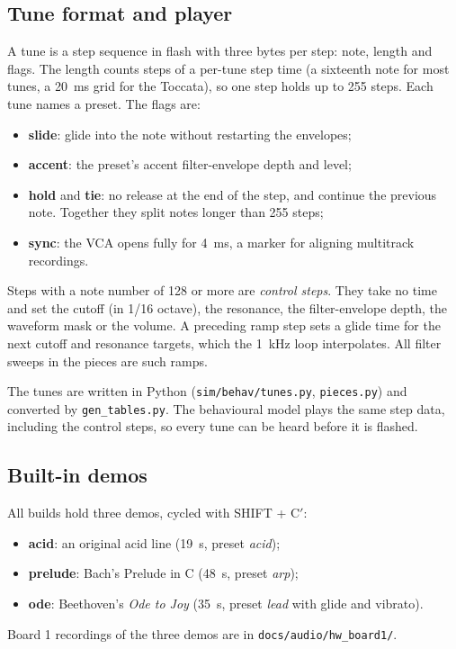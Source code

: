 \documentclass[11pt,a4paper]{article}
\newcommand{\file}[1]{\texttt{#1}}
\begin{document}
\subsection{Tune format and player}
A tune is a step sequence in flash with three bytes per step: note, length and flags. The length counts steps
of a per-tune step time (a sixteenth note for most tunes, a \SI{20}{ms} grid for the Toccata), so one step
holds up to 255 steps. Each tune names a preset. The flags are:
\begin{itemize}
  \item \textbf{slide}: glide into the note without restarting the envelopes;
  \item \textbf{accent}: the preset's accent filter-envelope depth and level;
  \item \textbf{hold} and \textbf{tie}: no release at the end of the step, and continue the previous note.
    Together they split notes longer than 255 steps;
  \item \textbf{sync}: the VCA opens fully for \SI{4}{ms}, a marker for aligning multitrack recordings.
\end{itemize}
Steps with a note number of 128 or more are \emph{control steps}. They take no time and set the cutoff
(in 1/16 octave), the resonance, the filter-envelope depth, the waveform mask or the volume. A preceding ramp
step sets a glide time for the next cutoff and resonance targets, which the \SI{1}{kHz} loop interpolates.
All filter sweeps in the pieces are such ramps.

The tunes are written in Python (\file{sim/behav/tunes.py}, \file{pieces.py}) and converted by
\file{gen\_tables.py}. The behavioural model plays the same step data, including the control steps, so
every tune can be heard before it is flashed.

\subsection{Built-in demos}
All builds hold three demos, cycled with SHIFT + C$'$:
\begin{itemize}
  \item \textbf{acid}: an original acid line (\SI{19}{s}, preset \emph{acid});
  \item \textbf{prelude}: Bach's Prelude in C (\SI{48}{s}, preset \emph{arp});
  \item \textbf{ode}: Beethoven's \emph{Ode to Joy} (\SI{35}{s}, preset \emph{lead} with glide and
    vibrato).
\end{itemize}
Board 1 recordings of the three demos are in \file{docs/audio/hw\_board1/}.
\end{document}
